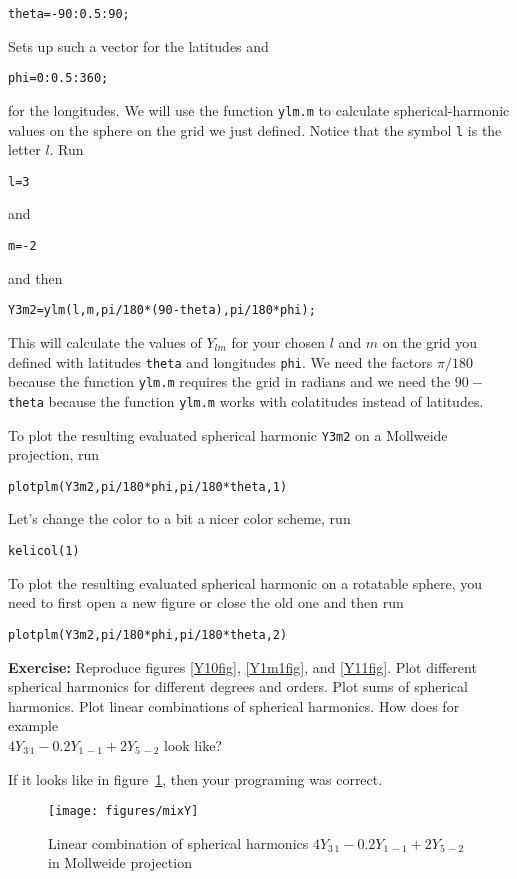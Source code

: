 \documentclass[11pt]{article}
\newcommand{\Yfun}{Y}
\begin{document}
\qquad \verb+theta=-90:0.5:90;+

Sets up such a vector for the latitudes and 

\qquad \verb+phi=0:0.5:360;+

for the longitudes. We will use the function \verb+ylm.m+ to
calculate spherical-harmonic values on the sphere on the grid we just
defined. Notice that the symbol \verb+l+ is the letter $l$. Run

\qquad \verb+l=3+ 

and 

\qquad \verb+m=-2+

and then 

\qquad \verb+Y3m2=ylm(l,m,pi/180*(90-theta),pi/180*phi);+

This will calculate the values of $\Yfun_{lm}$ for your chosen $l$ and
$m$ on the grid you defined with latitudes \verb+theta+ and longitudes
\verb+phi+. We need the factors $\pi/180$ because the function
\verb+ylm.m+ requires the grid in radians and we need the $90-$
\verb+theta+ because the function \verb+ylm.m+ works with colatitudes
instead of latitudes.

To plot the resulting evaluated spherical harmonic \verb+Y3m2+ on a
Mollweide projection, run
  
\qquad \verb+plotplm(Y3m2,pi/180*phi,pi/180*theta,1)+

Let's change the color to a bit a nicer color scheme, run

\quad \verb+kelicol(1)+


To plot the resulting evaluated spherical harmonic on a rotatable
sphere, you need to first open a new figure or close the old one and
then run

\qquad \verb+plotplm(Y3m2,pi/180*phi,pi/180*theta,2)+

\textbf{Exercise:} Reproduce figures \ref{Y10fig}, \ref{Y1m1fig}, and \ref{Y11fig}. Plot different spherical harmonics for different degrees and orders. Plot sums of spherical harmonics. Plot linear combinations of spherical harmonics. How does for example \\{$4\Yfun_{3\,1} - 0.2\Yfun_{1\,-1} +2\Yfun_{5\,-2}$} look like?

If it looks like in figure~\ref{MixY}, then your programing was
correct.

\begin{figure}%
  \centering
  \texttt{[image: figures/mixY]}
  \caption{Linear combination of spherical harmonics $4\Yfun_{3\,1} - 0.2\Yfun_{1\,-1} +2\Yfun_{5\,-2}$ in Mollweide projection}
  \label{MixY}
\end{figure}
\end{document}
